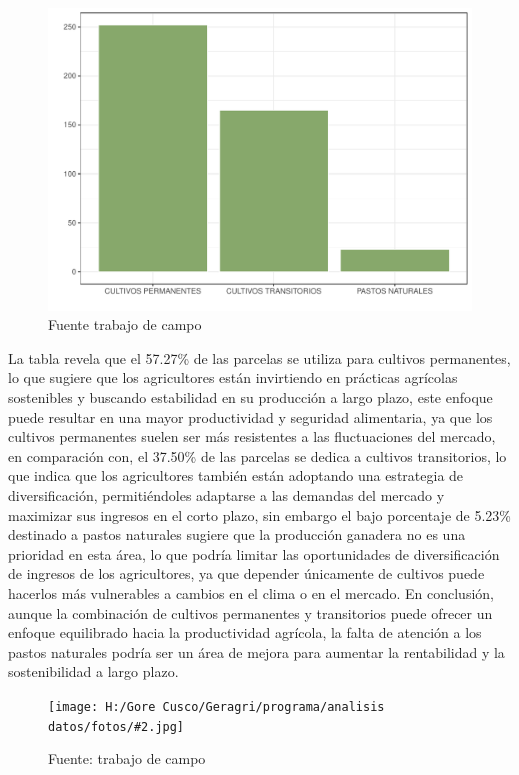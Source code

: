 \documentclass{article}\usepackage[]{graphicx}\usepackage[table]{xcolor}
\makeatletter
\def\maxwidth{ %
  \ifdim\Gin@nat@width>\linewidth
    \linewidth
  \else
    \Gin@nat@width
  \fi
}
\newenvironment{knitrout}{}{} %
\newenvironment{fotos}[2]
{\begin{figure}[H]
	\centering
	\caption{#1}
	\texttt{[image: H:/Gore Cusco/Geragri/programa/analisis datos/fotos/\#2.jpg]}
	\caption*{Fuente: trabajo de campo}}
{\end{figure}}
\newenvironment{graficas}[2]
{\begin{figure}[H]
		\centering
		\caption{#1}
		#2
		\caption*{Fuente trabajo de campo}}
{\end{figure}}
\makeatother
\begin{document}
\begin{graficas}
{uso de la parcela en el ultimo año}{
\begin{knitrout}
\definecolor{shadecolor}{rgb}{0.969, 0.969, 0.969}\color{fgcolor}
\includegraphics[width=\maxwidth]{figure/fig_quince-1} 
\end{knitrout}

}
\end{graficas}
La tabla  revela que el 57.27\% de las parcelas se utiliza para cultivos permanentes, lo que sugiere que los agricultores están invirtiendo en prácticas agrícolas sostenibles y buscando estabilidad en su producción a largo plazo, este enfoque puede resultar en una mayor productividad y seguridad alimentaria, ya que los cultivos permanentes suelen ser más resistentes a las fluctuaciones del mercado, en comparación con, el 37.50\% de las parcelas se dedica a cultivos transitorios, lo que indica que los agricultores también están adoptando una estrategia de diversificación, permitiéndoles adaptarse a las demandas del mercado y maximizar sus ingresos en el corto plazo, sin embargo el bajo porcentaje de 5.23\% destinado a pastos naturales sugiere que la producción ganadera no es una prioridad en esta área, lo que podría limitar las oportunidades de diversificación de ingresos de los agricultores, ya que depender únicamente de cultivos puede hacerlos más vulnerables a cambios en el clima o en el mercado. En conclusión, aunque la combinación de cultivos permanentes y transitorios puede ofrecer un enfoque equilibrado hacia la productividad agrícola, la falta de atención a los pastos naturales podría ser un área de mejora para aumentar la rentabilidad y la sostenibilidad a largo plazo.
\begin{fotos}
{sensibilizacion a la poblacion}{13}
\end{fotos}
\end{document}
